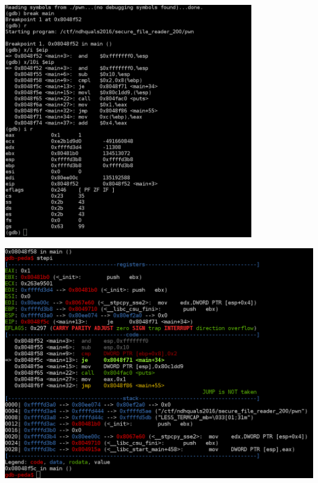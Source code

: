 {
\begin{frame}[plain]
  \begin{center}
    \includegraphics[width=0.8\textwidth]{./images/gdb-plain.png}
  \end{center}
\end{frame}

\begin{frame}[plain]
  \begin{center}
    \includegraphics[width=\textwidth]{./images/gdb-peda.png}
  \end{center}
\end{frame}
}


